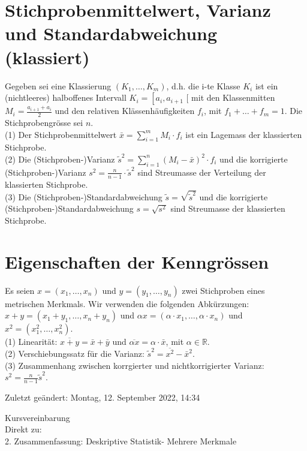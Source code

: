 \documentclass[10pt]{article}
\begin{document}
\section*{Stichprobenmittelwert, Varianz und Standardabweichung (klassiert)}
Gegeben sei eine Klassierung $\left(K_{1}, \ldots, K_{m}\right)$, d.h. die i-te Klasse $K_{i}$ ist ein (nichtleeres) halboffenes Intervall $K_{i}=\left[a_{i}, a_{i+1}\right.$ [ mit den Klassenmitten $M_{i}=\frac{a_{i+1}+a_{i}}{2}$ und den relativen Klässenhäufigkeiten $f_{i}$, mit $f_{1}+\ldots+f_{m}=1$. Die Stichprobengrösse sei $n$.\\
(1) Der Stichprobenmittelwert $\bar{x}=\sum_{i=1}^{m} M_{i} \cdot f_{i}$ ist ein Lagemass der klassierten Stichprobe.\\
(2) Die (Stichproben-)Varianz $\tilde{s}^{2}=\sum_{i=1}^{n}\left(M_{i}-\bar{x}\right)^{2} \cdot f_{i}$ und die korrigierte (Stichproben-)Varianz $s^{2}=\frac{n}{n-1} \cdot \tilde{s}^{2}$ sind Streumasse der Verteilung der klassierten Stichprobe.\\
(3) Die (Stichproben-)Standardabweichung $\tilde{s}=\sqrt{\tilde{s}^{2}}$ und die korrigierte (Stichproben-)Standardabweichung $s=\sqrt{s^{2}}$ sind Streumasse der klassierten Stichprobe.

\section*{Eigenschaften der Kenngrössen}
Es seien $x=\left(x_{1}, \ldots, x_{n}\right)$ und $y=\left(y_{1}, \ldots, y_{n}\right)$ zwei Stichproben eines metrischen Merkmals. Wir verwenden die folgenden Abkürzungen: $x+y=\left(x_{1}+y_{1}, \ldots, x_{n}+y_{n}\right)$ und $\alpha x=\left(\alpha \cdot x_{1}, \ldots, \alpha \cdot x_{n}\right)$ und $x^{2}=\left(x_{1}^{2}, \ldots, x_{n}^{2}\right)$.\\
(1) Linearität: $\overline{x+y}=\bar{x}+\bar{y}$ und $\overline{\alpha x}=\alpha \cdot \bar{x}$, mit $\alpha \in \mathbb{R}$.\\
(2) Verschiebungssatz für die Varianz: $\tilde{s}^{2}=\overline{x^{2}}-\bar{x}^{2}$.\\
(3) Zusammenhang zwischen korrgierter und nichtkorrigierter Varianz: $s^{2}=\frac{n}{n-1} \tilde{s}^{2}$.

Zuletzt geändert: Montag, 12. September 2022, 14:34

Kursvereinbarung\\
Direkt zu:\\
2. Zusammenfassung: Deskriptive Statistik- Mehrere Merkmale
\end{document}
